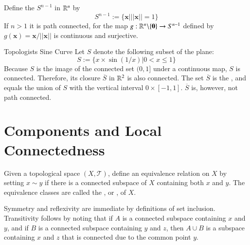 \documentclass[12pt, a4paper, twoside, openright, titlepage]{book}
\begin{document}
\begin{eg}{}{}
    Define the  $S^{n-1}$ in $\mathbb R^n$ by \begin{equation*}
        S^{n-1} := \{\mathbf{x}\vert||\mathbf{x}|| = 1\}
    \end{equation*}
    If $n >1$ it is path connected, for the map $g:\mathbb R^n\backslash\{\mathbf{0}\}\rightarrow S^{n-1}$ defined by $g(\mathbf{x}) = \mathbf{x}/||\mathbf{x}||$ is continuous and surjective.
\end{eg}

\begin{eg}{Topologists Sine Curve}{}
    Let $S$ denote the following subset of the plane: \begin{equation*}
        S := \{x\times \sin(1/x) \vert 0 < x \leq 1\}
    \end{equation*}
    Because $S$ is the image of the connected set $(0,1]$ under a continuous map, $S$ is connected. Therefore, its closure $\overline{S}$ in $\mathbb R^2$ is also connected. The set $\overline{S}$ is the , and equals the union of $S$ with the vertical interval $0\times [-1,1]$. $\overline{S}$ is, however, not path connected.
\end{eg}




\section{Components and Local Connectedness}

\begin{defn}{}{}
    Given a topological space $(X,\mathcal{T})$, define an equivalence relation on $X$ by setting $x \sim y$ if there is a connected subspace of $X$ containing both $x$ and $y$. The equivalence classes are called the , or , of $X$.
\end{defn}

Symmetry and reflexivity are immediate by definitions of set inclusion. Transitivity follows by noting that if $A$ is a connected subspace containing $x$ and $y$, and if $B$ is a connected subspace containing $y$ and $z$, then $A\cup B$ is a subspace containing $x$ and $z$ that is connected due to the common point $y$.
\end{document}
